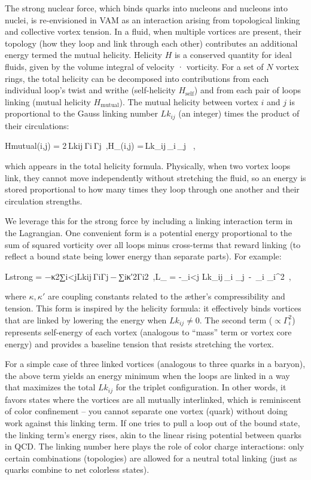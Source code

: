 The strong nuclear force, which binds quarks into nucleons and nucleons into nuclei, is re-envisioned in VAM as an interaction arising from topological linking and collective vortex tension. In a fluid, when multiple vortices are present, their topology (how they loop and link through each other) contributes an additional energy termed the mutual helicity. Helicity $H$ is a conserved quantity for ideal fluids, given by the volume integral of velocity · vorticity. For a set of $N$ vortex rings, the total helicity can be decomposed into contributions from each individual loop’s twist and writhe (self-helicity $H_{\text{self}}$) and from each pair of loops linking (mutual helicity $H_{\text{mutual}}$). The mutual helicity between vortex $i$ and $j$ is proportional to the Gauss linking number $Lk_{ij}$ (an integer) times the product of their circulations:


Hmutual(i,j)  =  2 Lkij Γi Γj ,H_{}(i,j) \;=\,Lk_{ij}\,\Gamma_i\,\Gamma_j ~,


which appears in the total helicity formula. Physically, when two vortex loops link, they cannot move independently without stretching the fluid, so an energy is stored proportional to how many times they loop through one another and their circulation strengths.


We leverage this for the strong force by including a linking interaction term in the Lagrangian. One convenient form is a potential energy proportional to the sum of squared vorticity over all loops minus cross-terms that reward linking (to reflect a bound state being lower energy than separate parts). For example:

Lstrong  =  −κ2∑i<jLkij ΓiΓj − ∑iκ′2Γi2 ,L_{} \;=\; -\sum_{i<j} Lk_{ij}\,\Gamma_i \Gamma_j \,-\, \sum_i  \Gamma_i^2~,

where $\kappa, \kappa'$ are coupling constants related to the æther’s compressibility and tension. This form is inspired by the helicity formula: it effectively binds vortices that are linked by lowering the energy when $Lk_{ij} \neq 0$. The second term ($\propto \Gamma_i^2$) represents self-energy of each vortex (analogous to “mass” term or vortex core energy) and provides a baseline tension that resists stretching the vortex.


For a simple case of three linked vortices (analogous to three quarks in a baryon), the above term yields an energy minimum when the loops are linked in a way that maximizes the total $Lk_{ij}$ for the triplet configuration. In other words, it favors states where the vortices are all mutually interlinked, which is reminiscent of color confinement – you cannot separate one vortex (quark) without doing work against this linking term. If one tries to pull a loop out of the bound state, the linking term’s energy rises, akin to the linear rising potential between quarks in QCD. The linking number here plays the role of color charge interactions: only certain combinations (topologies) are allowed for a neutral total linking (just as quarks combine to net colorless states).


